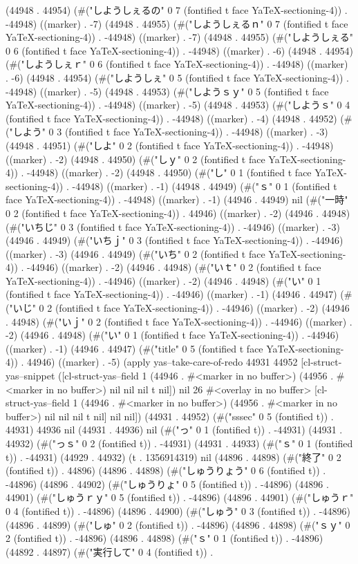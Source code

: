 (44948 . 44954) (#("しようしぇるの" 0 7 (fontified t face YaTeX-sectioning-4)) . -44948) ((marker) . -7) (44948 . 44955) (#("しようしぇるｎ" 0 7 (fontified t face YaTeX-sectioning-4)) . -44948) ((marker) . -7) (44948 . 44955) (#("しようしぇる" 0 6 (fontified t face YaTeX-sectioning-4)) . -44948) ((marker) . -6) (44948 . 44954) (#("しようしぇｒ" 0 6 (fontified t face YaTeX-sectioning-4)) . -44948) ((marker) . -6) (44948 . 44954) (#("しようしぇ" 0 5 (fontified t face YaTeX-sectioning-4)) . -44948) ((marker) . -5) (44948 . 44953) (#("しようｓｙ" 0 5 (fontified t face YaTeX-sectioning-4)) . -44948) ((marker) . -5) (44948 . 44953) (#("しようｓ" 0 4 (fontified t face YaTeX-sectioning-4)) . -44948) ((marker) . -4) (44948 . 44952) (#("しよう" 0 3 (fontified t face YaTeX-sectioning-4)) . -44948) ((marker) . -3) (44948 . 44951) (#("しよ" 0 2 (fontified t face YaTeX-sectioning-4)) . -44948) ((marker) . -2) (44948 . 44950) (#("しｙ" 0 2 (fontified t face YaTeX-sectioning-4)) . -44948) ((marker) . -2) (44948 . 44950) (#("し" 0 1 (fontified t face YaTeX-sectioning-4)) . -44948) ((marker) . -1) (44948 . 44949) (#("ｓ" 0 1 (fontified t face YaTeX-sectioning-4)) . -44948) ((marker) . -1) (44946 . 44949) nil (#("一時" 0 2 (fontified t face YaTeX-sectioning-4)) . 44946) ((marker) . -2) (44946 . 44948) (#("いちじ" 0 3 (fontified t face YaTeX-sectioning-4)) . -44946) ((marker) . -3) (44946 . 44949) (#("いちｊ" 0 3 (fontified t face YaTeX-sectioning-4)) . -44946) ((marker) . -3) (44946 . 44949) (#("いち" 0 2 (fontified t face YaTeX-sectioning-4)) . -44946) ((marker) . -2) (44946 . 44948) (#("いｔ" 0 2 (fontified t face YaTeX-sectioning-4)) . -44946) ((marker) . -2) (44946 . 44948) (#("い" 0 1 (fontified t face YaTeX-sectioning-4)) . -44946) ((marker) . -1) (44946 . 44947) (#("いじ" 0 2 (fontified t face YaTeX-sectioning-4)) . -44946) ((marker) . -2) (44946 . 44948) (#("いｊ" 0 2 (fontified t face YaTeX-sectioning-4)) . -44946) ((marker) . -2) (44946 . 44948) (#("い" 0 1 (fontified t face YaTeX-sectioning-4)) . -44946) ((marker) . -1) (44946 . 44947) (#("title" 0 5 (fontified t face YaTeX-sectioning-4)) . 44946) ((marker) . -5) (apply yas--take-care-of-redo 44931 44952 [cl-struct-yas--snippet ([cl-struct-yas--field 1 (44946 . #<marker in no buffer>) (44956 . #<marker in no buffer>) nil nil nil t nil]) nil 26 #<overlay in no buffer> [cl-struct-yas--field 1 (44946 . #<marker in no buffer>) (44956 . #<marker in no buffer>) nil nil nil t nil] nil nil]) (44931 . 44952) (#("sssec" 0 5 (fontified t)) . 44931) 44936 nil (44931 . 44936) nil (#("っ" 0 1 (fontified t)) . -44931) (44931 . 44932) (#("っｓ" 0 2 (fontified t)) . -44931) (44931 . 44933) (#("ｓ" 0 1 (fontified t)) . -44931) (44929 . 44932) (t . 1356914319) nil (44896 . 44898) (#("終了" 0 2 (fontified t)) . 44896) (44896 . 44898) (#("しゅうりょう" 0 6 (fontified t)) . -44896) (44896 . 44902) (#("しゅうりょ" 0 5 (fontified t)) . -44896) (44896 . 44901) (#("しゅうｒｙ" 0 5 (fontified t)) . -44896) (44896 . 44901) (#("しゅうｒ" 0 4 (fontified t)) . -44896) (44896 . 44900) (#("しゅう" 0 3 (fontified t)) . -44896) (44896 . 44899) (#("しゅ" 0 2 (fontified t)) . -44896) (44896 . 44898) (#("ｓｙ" 0 2 (fontified t)) . -44896) (44896 . 44898) (#("ｓ" 0 1 (fontified t)) . -44896) (44892 . 44897) (#("実行して" 0 4 (fontified t)) . 